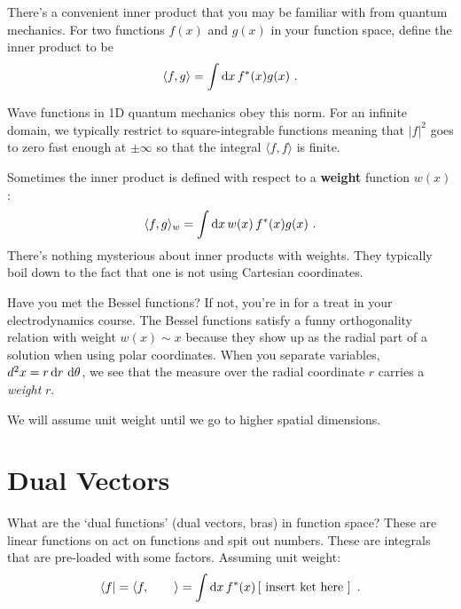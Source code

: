There's a convenient inner product that you may be familiar with from quantum mechanics. For two functions $f(x)$ and $g(x)$ in your function space, define the inner product to be
\begin{align}
  \langle f,g\rangle 
  =
  \int \operatorname{d}\mkern-3mu^{}\mkern-1mu{x}\, f^*(x)g(x) \ .
  \label{eq:summary:L2:inner:product}
\end{align}
\begin{example}
Wave functions in 1D quantum mechanics obey this norm. For an infinite domain, we typically restrict to square-integrable functions meaning that $|f|^2$ goes to zero fast enough at $\pm \infty$ so that the integral $\langle f, f\rangle$ is finite. 
\end{example}
Sometimes the inner product is defined with respect to a \textbf{weight} function $w(x)$:
\begin{align}
  \langle f,g\rangle_w 
  =
  \int \operatorname{d}\mkern-3mu^{}\mkern-1mu{x}\, w(x)\, f^*(x)g(x) \ .
  \label{eq:summary:weighted:inner:product}
\end{align}
There's nothing mysterious about inner products with weights. They typically boil down to the fact that one is not using Cartesian coordinates. 
\begin{example}
Have you met the Bessel functions? If not, you're in for a treat in your electrodynamics course. The Bessel functions satisfy a funny orthogonality relation with weight $w(x)\sim x$ because they show up as the radial part of a solution when using polar coordinates. When you separate variables, $d^2x = r\operatorname{d}\mkern-3mu^{}\mkern-1mu{r}\,\operatorname{d}\mkern-3mu^{}\mkern-1mu{\theta}$, we see that the measure over the radial coordinate $r$ carries a \emph{weight} $r$.
\end{example}
We will assume unit weight until we go to higher spatial dimensions.


\section{Dual Vectors}

What are the `dual functions' (dual vectors, bras) in function space? These are linear functions on act on functions and spit out numbers. These are integrals that are pre-loaded with some factors. Assuming unit weight:
\begin{align}
  \langle f | = \langle f, \qquad \rangle
  = 
  \int \operatorname{d}\mkern-3mu^{}\mkern-1mu{x} \, f^*(x) \left[\textnormal{ insert ket here }\right] \ .
\end{align}




